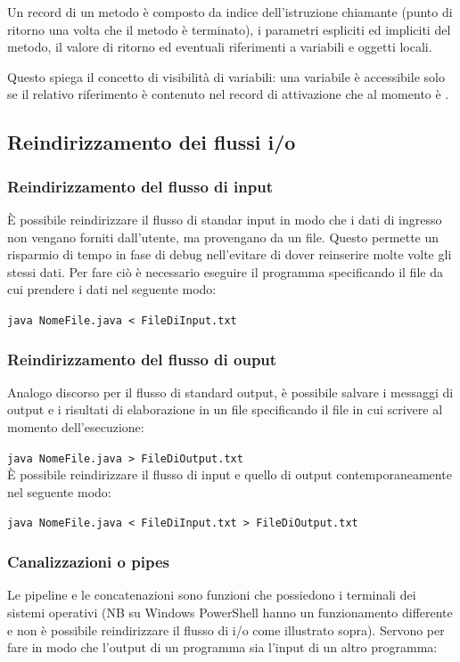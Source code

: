 \documentclass[a4paper]{article}
\begin{document}
Un record di un metodo è composto da indice dell'istruzione chiamante (punto di ritorno una volta che il metodo è terminato),
i parametri espliciti ed impliciti del metodo, il valore di ritorno ed eventuali riferimenti a variabili e oggetti locali.

Questo spiega il concetto di visibilità di variabili: una variabile è accessibile solo se il relativo riferimento è contenuto nel
record di attivazione che al momento è .

\subsection{Reindirizzamento dei flussi i/o}
\subsubsection*{Reindirizzamento del flusso di input}
È possibile reindirizzare il flusso di standar input in modo che i dati di ingresso non vengano forniti dall'utente, ma provengano
da un file. Questo permette un risparmio di tempo in fase di debug nell'evitare di dover reinserire molte volte gli stessi dati.
Per fare ciò è necessario eseguire il programma specificando il file da cui prendere i dati nel seguente modo:

\verb|java NomeFile.java < FileDiInput.txt|

\subsubsection*{Reindirizzamento del flusso di ouput}
Analogo discorso per il flusso di standard output, è possibile salvare i messaggi di output e i risultati di elaborazione in un file
specificando il file in cui scrivere al momento dell'esecuzione:

\verb|java NomeFile.java > FileDiOutput.txt|
\\
È possibile reindirizzare il flusso di input e quello di output contemporaneamente nel seguente modo:

\verb|java NomeFile.java < FileDiInput.txt > FileDiOutput.txt|


\subsubsection*{Canalizzazioni o pipes}
Le pipeline e le concatenazioni sono funzioni che possiedono i terminali dei sistemi operativi (NB su Windows PowerShell hanno un funzionamento
differente e non è possibile reindirizzare il flusso di i/o come illustrato sopra). Servono per fare in modo che l'output di un programma sia 
l'input di un altro programma:
\end{document}
